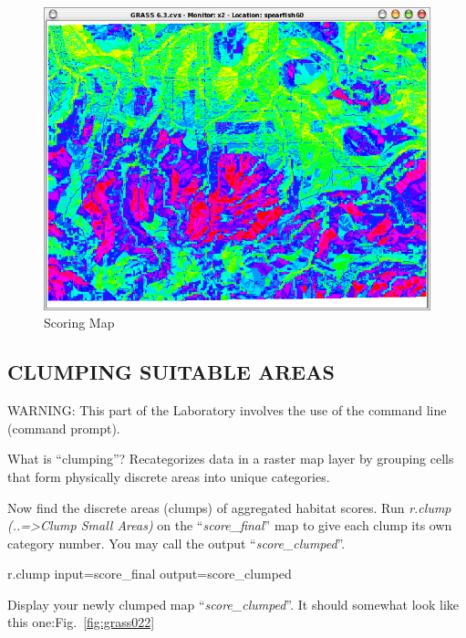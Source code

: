 \begin{figure}[htbp]
   \centering
   \includegraphics[scale=0.35]{grass021.png}
   \caption{Scoring Map}
   \label{fig:grass021}
\end{figure}

\subsection{CLUMPING SUITABLE AREAS}
WARNING: This part of the Laboratory involves the use of the command line (command prompt).

What is ``clumping''?
Recategorizes data in a raster map layer by grouping cells that form physically discrete areas into unique categories.

Now find the discrete areas (clumps) of aggregated habitat scores. 
Run \textit{r.clump (..=>Clump Small Areas) }on the ``\textit{score\_final}'' map to give each clump its own category number. You may call the output ``\textit{score\_clumped}''.

\begin{smallverbatim}
r.clump input=score_final output=score_clumped 
\end{smallverbatim}

Display your newly clumped map ``\textit{score\_clumped}''. It should somewhat look like this one:Fig.~\ref{fig:grass022}

